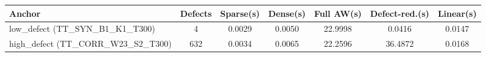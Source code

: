 \begin{tabular}{lcccccc}
\toprule
Anchor & Defects & Sparse(s) & Dense(s) & Full AW(s) & Defect-red.(s) & Linear(s) \\
\midrule
low\_defect (TT\_SYN\_B1\_K1\_T300) & 4 & 0.0029 & 0.0050 & 22.9998 & 0.0416 & 0.0147 \\
high\_defect (TT\_CORR\_W23\_S2\_T300) & 632 & 0.0034 & 0.0065 & 22.2596 & 36.4872 & 0.0168 \\
\bottomrule
\end{tabular}
